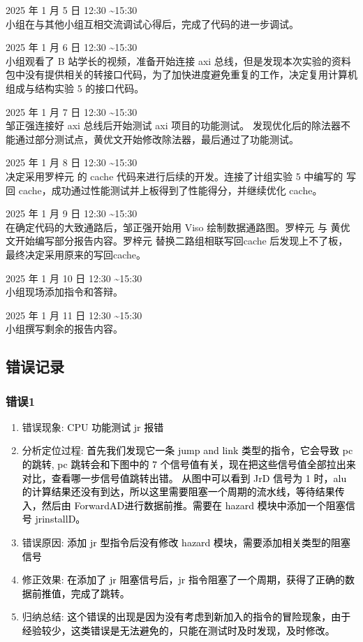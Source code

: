 {2025 年 1 月 5 日 12:30 \sim 15:30\\
小组在与其他小组互相交流调试心得后，完成了代码的进一步调试。

2025 年 1 月 6 日 12:30 \sim 15:30\\
小组观看了 B 站学长的视频，准备开始连接 axi 总线，但是发现本次实验的资料包中没有提供相关的转接口代码，为了加快进度避免重复的工作，决定复用计算机组成与结构实验 5 的接口代码。

2025 年 1 月 7 日 12:30 \sim 15:30\\
邹正强连接好 axi 总线后开始测试 axi 项目的功能测试。 发现优化后的除法器不能通过部分测试点，黄优文开始修改除法器，最后通过了功能测试。

2025 年 1 月 8 日 12:30 \sim 15:30\\
决定采用罗梓元 的 cache 代码来进行后续的开发。连接了计组实验 5 中编写的 写回 cache，成功通过性能测试并上板得到了性能得分，并继续优化 cache。

2025 年 1 月 9 日 12:30 \sim 15:30\\
在确定代码的大致通路后，邹正强开始用 Viso 绘制数据通路图。罗梓元 与 黄优文开始编写部分报告内容。罗梓元 替换二路组相联写回cache 后发现上不了板，最终决定采用原来的写回cache。

2025 年 1 月 10 日 12:30 \sim 15:30\\
小组现场添加指令和答辩。

2025 年 1 月 11 日 12:30 \sim 15:30\\
小组撰写剩余的报告内容。
}

\subsection{错误记录}

\subsubsection{错误1}
\begin{enumerate}[(1)]
    \item 错误现象:\textcolor{black}{ CPU 功能测试 jr 报错}
    \item 分析定位过程:\textcolor{black}{ 首先我们发现它一条 jump and link 类型的指令，它会导致 pc 的跳转, pc 跳转会和下图中的 7 个信号值有关，现在把这些信号值全部拉出来对比，查看哪一步信号值跳转出错。 从图中可以看到 JrD 信号为 1 时，alu 的计算结果还没有到达，所以这里需要阻塞一个周期的流水线，等待结果传入，然后由 ForwardAD进行数据前推。需要在 hazard 模块中添加一个阻塞信号 jrinstallD。
}
    \item 错误原因:\textcolor{black}{ 添加 jr 型指令后没有修改 hazard 模块，需要添加相关类型的阻塞信号}
    \item 修正效果:\textcolor{black}{ 在添加了 jr 阻塞信号后，jr 指令阻塞了一个周期，获得了正确的数据前推值，完成了跳转。}
    \item 归纳总结:\textcolor{black}{ 这个错误的出现是因为没有考虑到新加入的指令的冒险现象，由于经验较少，这类错误是无法避免的，只能在测试时及时发现，及时修改。}
\end{enumerate}

